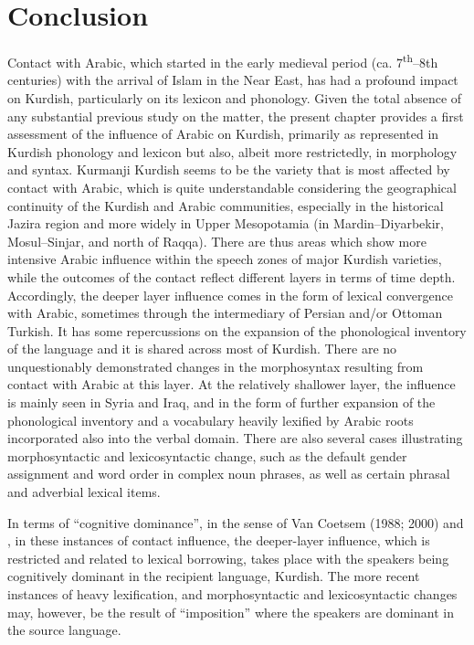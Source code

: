 \documentclass[output=paper]{langsci/langscibook}
\begin{document}
\section{Conclusion}
Contact with Arabic, which started in the early medieval period (ca. 7\textsuperscript{th}–8th centuries) with the arrival of Islam in the Near East, has had a profound impact on Kurdish, particularly on its lexicon and phonology. Given the total absence of any substantial previous study on the matter, the present chapter provides a first assessment of the influence of Arabic on Kurdish, primarily as represented in Kurdish phonology and lexicon but also, albeit more restrictedly, in morphology and syntax. Kurmanji Kurdish seems to be the variety that is most affected by contact with Arabic, which is quite understandable considering the geographical continuity of the Kurdish and Arabic communities, especially in the historical Jazira region and more widely in Upper Mesopotamia (in Mardin–Diyarbekir, Mosul–Sinjar, and north of Raqqa). There are thus areas which show more intensive Arabic influence within the speech zones of major Kurdish varieties, while the outcomes of the contact reflect different layers in terms of time depth. Accordingly, the deeper layer influence comes in the form of lexical convergence with Arabic, sometimes through the intermediary of Persian and/or Ottoman Turkish. It has some repercussions on the expansion of the phonological inventory of the language and it is shared across most of Kurdish. There are no unquestionably demonstrated changes in the morphosyntax resulting from contact with Arabic at this layer. At the relatively shallower layer, the influence is mainly seen in Syria and Iraq, and in the form of further expansion of the phonological inventory and a vocabulary heavily lexified by Arabic roots incorporated also into the verbal domain. There are also several cases illustrating morphosyntactic and lexicosyntactic change, such as the default gender assignment and word order in complex noun phrases, as well as certain phrasal and adverbial lexical items. 

In terms of “cognitive dominance”, in the sense of Van Coetsem (1988; 2000) and \citet{Lucas2015}, in these instances of contact influence, the deeper-layer influence, which is restricted and related to lexical borrowing, takes place with the speakers being cognitively dominant in the recipient language, Kurdish. The more recent instances of heavy lexification, and morphosyntactic and lexicosyntactic changes may, however, be the result of “imposition” where the speakers are dominant in the source language. 
\end{document}
